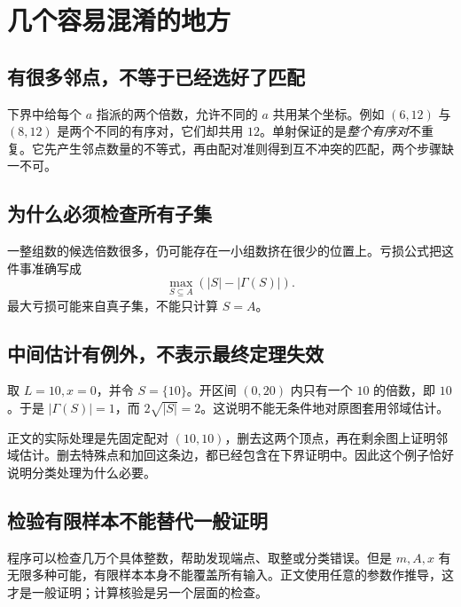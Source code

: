 \documentclass[UTF8,a4paper,oneside,openany,fontset=fandol,zihao=-4]{ctexbook}
\theoremstyle{guide}
\begin{document}
\section{几个容易混淆的地方}
\subsection{有很多邻点，不等于已经选好了匹配}
下界中给每个 $a$ 指派的两个倍数，允许不同的 $a$ 共用某个坐标。例如 $(6,12)$ 与 $(8,12)$ 是两个不同的有序对，它们却共用 $12$。单射保证的是\emph{整个有序对}不重复。它先产生邻点数量的不等式，再由配对准则得到互不冲突的匹配，两个步骤缺一不可。

\subsection{为什么必须检查所有子集}
一整组数的候选倍数很多，仍可能存在一小组数挤在很少的位置上。亏损公式把这件事准确写成
\[
\max_{S\subseteq A}(|S|-|\Gamma(S)|).
\]
最大亏损可能来自真子集，不能只计算 $S=A$。

\subsection{中间估计有例外，不表示最终定理失效}
取 $L=10,x=0$，并令 $S=\{10\}$。开区间 $(0,20)$ 内只有一个 $10$ 的倍数，即 $10$。于是 $|\Gamma(S)|=1$，而 $2\sqrt{|S|}=2$。这说明不能无条件地对原图套用邻域估计。

正文的实际处理是先固定配对 $(10,10)$，删去这两个顶点，再在剩余图上证明邻域估计。删去特殊点和加回这条边，都已经包含在下界证明中。因此这个例子恰好说明分类处理为什么必要。

\subsection{检验有限样本不能替代一般证明}
程序可以检查几万个具体整数，帮助发现端点、取整或分类错误。但是 $m,A,x$ 有无限多种可能，有限样本本身不能覆盖所有输入。正文使用任意的参数作推导，这才是一般证明；计算核验是另一个层面的检查。
\end{document}
